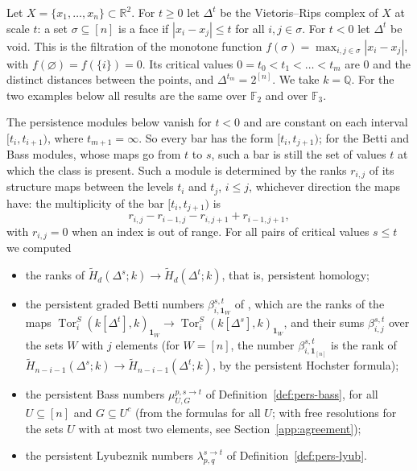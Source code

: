 \documentclass[11pt]{article}
\theoremstyle{plain}
\theoremstyle{definition}
\begin{document}
Let $X=\{x_1,\dots,x_n\}\subset\mathbb{R}^2$. For $t\ge0$ let $\Delta^t$ be the Vietoris--Rips complex of $X$ at scale $t$: a set $\sigma\subseteq[n]$ is a face if $|x_i-x_j|\le t$ for all $i,j\in\sigma$. For $t<0$ let $\Delta^t$ be void. This is the filtration of the monotone function $f(\sigma)=\max_{i,j\in\sigma}|x_i-x_j|$, with $f(\varnothing)=f(\{i\})=0$. Its critical values $0=t_0<t_1<\dots<t_m$ are $0$ and the distinct distances between the points, and $\Delta^{t_m}=2^{[n]}$. We take $k=\mathbb{Q}$. For the two examples below all results are the same over $\mathbb{F}_2$ and over $\mathbb{F}_3$.

The persistence modules below vanish for $t<0$ and are constant on each interval $[t_i,t_{i+1})$, where $t_{m+1}=\infty$. So every bar has the form $[t_i,t_{j+1})$; for the Betti and Bass modules, whose maps go from $t$ to $s$, such a bar is still the set of values $t$ at which the class is present. Such a module is determined by the ranks $r_{i,j}$ of its structure maps between the levels $t_i$ and $t_j$, $i\le j$, whichever direction the maps have: the multiplicity of the bar $[t_i,t_{j+1})$ is
\[
 r_{i,j}-r_{i-1,j}-r_{i,j+1}+r_{i-1,j+1},
\]
with $r_{i,j}=0$ when an index is out of range. For all pairs of critical values $s\le t$ we computed
\begin{itemize}
\item the ranks of $\widetilde{H}_d(\Delta^s;k)\to\widetilde{H}_d(\Delta^t;k)$, that is, persistent homology;
\item the persistent graded Betti numbers $\beta^{s,t}_{i,\mathbf 1_W}$ of \cite{SuwayyidWeiGraphs}, which are the ranks of the maps $\operatorname{Tor}^S_i(k[\Delta^t],k)_{\mathbf 1_W}\to\operatorname{Tor}^S_i(k[\Delta^s],k)_{\mathbf 1_W}$, and their sums $\beta^{s,t}_{i,j}$ over the sets $W$ with $j$ elements (for $W=[n]$, the number $\beta^{s,t}_{i,\mathbf 1_{[n]}}$ is the rank of $\widetilde{H}_{n-i-1}(\Delta^s;k)\to\widetilde{H}_{n-i-1}(\Delta^t;k)$, by the persistent Hochster formula);
\item the persistent Bass numbers $\mu^{p,s\to t}_{U,G}$ of Definition~\ref{def:pers-bass}, for all $U\subseteq[n]$ and $G\subseteq U^c$ (from the formulas for all $U$; with free resolutions for the sets $U$ with at most two elements, see Section~\ref{app:agreement});
\item the persistent Lyubeznik numbers $\lambda^{s\to t}_{p,q}$ of Definition~\ref{def:pers-lyub}.
\end{itemize}
\end{document}
